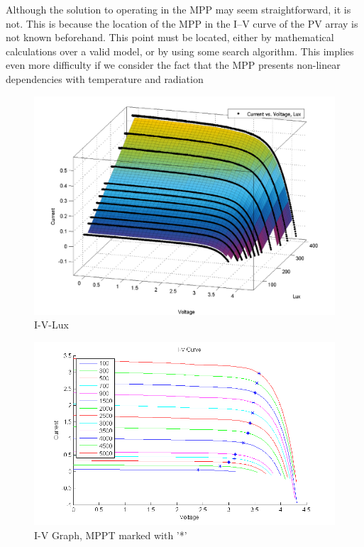Although the solution to operating in the \ac{MPP} may seem straightforward, it is not. This is because the location of the \ac{MPP} in the I–V curve of the PV array is not known beforehand. This point must be located, either by mathematical calculations over a valid model, or by using some search algorithm. This implies even more difficulty if we consider the fact that the \ac{MPP} presents non-linear dependencies with temperature and radiation\cite{enrique2010reliable}\\





  \begin{figure}[H]
  \begin{center}
  \includegraphics[width=\textwidth]{images/I-V-lux}
  \caption{I-V-Lux}
  \label{fig:IVgraph}
  \end{center}
  \end{figure}
  
    \begin{figure}[H]
    \begin{center}
    \includegraphics[width=\textwidth]{images/IV_lux_MPP}
    \caption{I-V Graph, MPPT marked with '*'}
    \label{fig:IV_mppgraph}
    \end{center}
    \end{figure}
  
